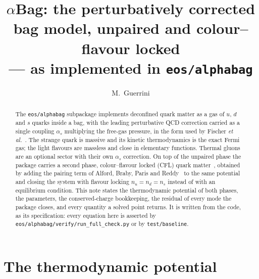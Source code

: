 \documentclass[aps,prc,onecolumn,superscriptaddress,nofootinbib,10pt]{revtex4-2}
\newcommand{\as}{\alpha_s}
\begin{document}
\title{$\alpha$Bag: the perturbatively corrected bag model, unpaired and
       colour--flavour locked \\
       --- as implemented in \texttt{eos/alphabag}}

\author{M.~Guerrini}

\begin{abstract}
The \texttt{eos/alphabag} subpackage implements deconfined quark matter as a
gas of $u$, $d$ and $s$ quarks inside a bag, with the leading perturbative QCD
correction carried as a single coupling $\as$ multiplying the free-gas
pressure, in the form used by Fischer \textit{et al.}~\cite{Fischer2011}. The
strange quark is massive and its kinetic thermodynamics is the exact Fermi
gas; the light flavours are massless and close in elementary functions.
Thermal gluons are an optional sector with their own $\as$ correction. On top
of the unpaired phase the package carries a second phase, colour--flavour
locked (CFL) quark matter~\cite{AlfordRajagopalWilczek1999}, obtained by
adding the pairing term of Alford, Braby, Paris and
Reddy~\cite{AlfordBrabyParisReddy2005} to the same potential and closing the
system with flavour locking $n_u = n_d = n_s$ instead of with an equilibrium
condition. This note states the thermodynamic potential of both phases, the
parameters, the conserved-charge bookkeeping, the residual of every mode the
package closes, and every quantity a solved point returns. It is written from
the code, as its specification: every equation here is asserted by
\texttt{eos/alphabag/verify/run\_full\_check.py} or by \texttt{test/baseline}.
\end{abstract}

\maketitle

\section{The thermodynamic potential}
\label{sec:potential}
\end{document}
